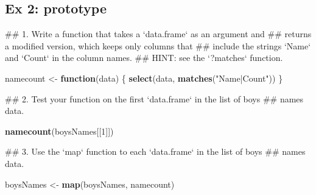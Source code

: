 \documentclass[]{book}
\newenvironment{Shaded}{\begin{snugshade}}{\end{snugshade}}
\newcommand{\KeywordTok}[1]{\textcolor[rgb]{0.13,0.29,0.53}{\textbf{#1}}}
\newcommand{\DataTypeTok}[1]{\textcolor[rgb]{0.13,0.29,0.53}{#1}}
\newcommand{\DecValTok}[1]{\textcolor[rgb]{0.00,0.00,0.81}{#1}}
\newcommand{\StringTok}[1]{\textcolor[rgb]{0.31,0.60,0.02}{#1}}
\newcommand{\ControlFlowTok}[1]{\textcolor[rgb]{0.13,0.29,0.53}{\textbf{#1}}}
\newcommand{\OperatorTok}[1]{\textcolor[rgb]{0.81,0.36,0.00}{\textbf{#1}}}
\newcommand{\NormalTok}[1]{#1}
\begin{document}
\begin{Shaded}
\end{Shaded}

\subsection{Ex 2: prototype}\label{ex-2-prototype-2}

\begin{Shaded}
\begin{Highlighting}[]
\NormalTok{  ## 1. Write a function that takes a `data.frame` as an argument and}
\NormalTok{  ##   returns a modified version, which keeps only columns that}
\NormalTok{  ##   include the strings `Name` and `Count` in the column names.}
\NormalTok{  ##   HINT: see the `?matches` function.}

\NormalTok{  namecount <-}\StringTok{ }\ControlFlowTok{function}\NormalTok{(data) \{}
      \KeywordTok{select}\NormalTok{(data, }\KeywordTok{matches}\NormalTok{(}\StringTok{"Name|Count"}\NormalTok{))}
\NormalTok{  \}}
     
\NormalTok{  ## 2. Test your function on the first `data.frame` in the list of boys}
\NormalTok{  ##    names data.}

  \KeywordTok{namecount}\NormalTok{(boysNames[[}\DecValTok{1}\NormalTok{]])}
  
\NormalTok{  ## 3. Use the `map` function to each `data.frame` in the list of boys}
\NormalTok{  ##    names data.}

\NormalTok{  boysNames <-}\StringTok{ }\KeywordTok{map}\NormalTok{(boysNames, namecount)}
\end{Highlighting}
\end{Shaded}
\end{document}
